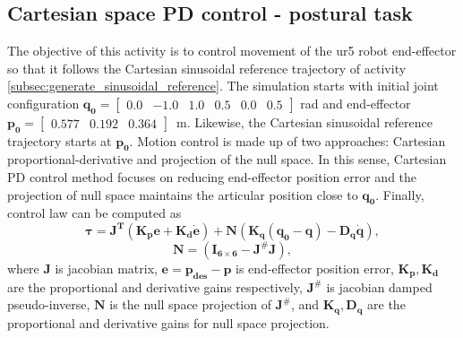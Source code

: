 \graphicspath{{images/act_1.5/}}
\subsection{Cartesian space PD control - postural task}
\label{subsec:cartesian_PD_control_postural_task}
The objective of this activity is to control movement of the ur5 robot end-effector so that it follows the Cartesian sinusoidal reference trajectory of activity \ref{subsec:generate_sinusoidal_reference}. The simulation starts with initial joint configuration $\mathbf{q_0}=\begin{bmatrix} 0.0 & -1.0 & 1.0 & 0.5 & 0.0 & 0.5 \end{bmatrix}$ rad and end-effector $\mathbf{p_0}=\begin{bmatrix}  0.577 &   0.192 &   0.364 \end{bmatrix}$~m. Likewise, the Cartesian sinusoidal reference trajectory starts at $\mathbf{p_0}$. Motion control is made up of two approaches: Cartesian proportional-derivative and projection of the null space. In this sense, Cartesian PD control method focuses on reducing end-effector position error and the projection of null space maintains the articular position close to $\mathbf{q_0}$. Finally, control law can be computed as 
\begin{equation}
	\boldsymbol{\tau}
	= \mathbf{J^T} (\mathbf{K_p e} + \mathbf{K_d \dot{e}}) + \mathbf{N} \left(\mathbf{K_q(q_0-q) - D_q \dot{q}} \right),
	\label{eq:cartesian_PD_N}
\end{equation}
\begin{equation*}
	\mathbf{N}=(\mathbf{I_{6 \times 6}} - \mathbf{J^{\#} J} ),
\end{equation*}
\noindent where $\mathbf{J}$ is jacobian matrix, $\mathbf{e}=\mathbf{p_{des} - p}$ is end-effector position error, $\mathbf{K_p, K_d}$ are the proportional and derivative gains respectively, $\mathbf{J^{\#}}$ is jacobian damped pseudo-inverse, $\mathbf{N}$ is the null space projection of $\mathbf{J^{\#}}$, and $\mathbf{K_q, D_q}$ are the proportional and derivative gains for null space projection. \vspace{.5cm}

